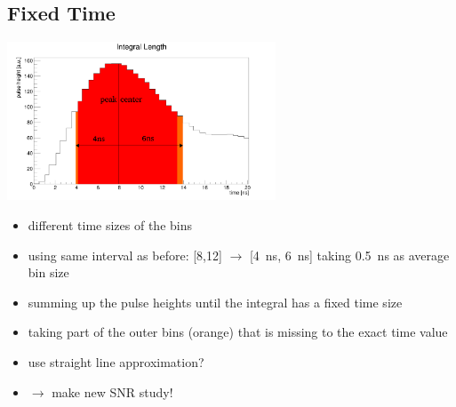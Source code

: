 \documentclass[9pt]{beamer}
\begin{document}
\subsection{Fixed Time}
\begin{frame}
	\begin{center}
		\includegraphics[width=8cm]{IntegralLength}
	\end{center}
	\begin{itemize}
		\setlength{\itemsep}{\fill}
		\item different time sizes of the bins
		\item using same interval as before: [8,12] $\rightarrow$ [\SI{4}{ns}, \SI{6}{ns}] taking \SI{.5}{ns} as average bin size
		\item summing up the pulse heights until the integral has a fixed time size
		\item taking part of the outer bins (orange) that is missing to the exact time value
		\item use straight line approximation?
		\item $\rightarrow$ make new SNR study!
	\end{itemize}
\end{frame}
\end{document}
